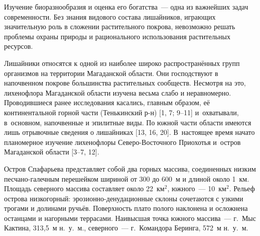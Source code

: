  

\makeProcTitle
{}

Изучение биоразнообразия и оценка его богатства~--- одна из важнейших задач современности. Без знания видового состава лишайников, играющих значительную роль в сложении растительного покрова, невозможно решать проблемы охраны природы и рационального использования растительных ресурсов.

Лишайники относятся к одной из наиболее широко распространённых групп организмов на территории Магаданской области. Они господствуют в напочвенном покрове большинства растительных сообществ. Несмотря на это, лихенофлора Магаданской области изучена весьма слабо и неравномерно. Проводившиеся ранее исследования касались, главным образом, её континентальной горной части (Тенькинский р-н) [1, 7; 9--11] и~охватывали, в~основном, напочвенные и эпилитные виды. По южной части области имеются лишь отрывочные сведения о лишайниках [13, 16, 20]. В~настоящее время начато планомерное изучение лихенофлоры Северо-Восточного Приохотья и~остров Магаданской области [3--7, 12].

Остров Спафарьева представляет собой два горных массива, соединенных низким пес\-ча\-но-галечным перешейком шириной от 300 до 600~м и длиной около 1~км. Площадь северного массива составляет около 22~км$^2$, южного~--- 10~км$^2$. Рельеф острова низкогорный: эрозионно-денудационные склоны сочетаются с узкими трогами и долинами ручьёв. Поверхность плато полого наклонена и осложнена останцами и нагорными террасами. Наивысшая точка южного массива~--- г.~Мыс Кактина, 313,5~м н.~у.~м., северного~--- г.~Командора Беринга, 572~м н.~у.~м.

